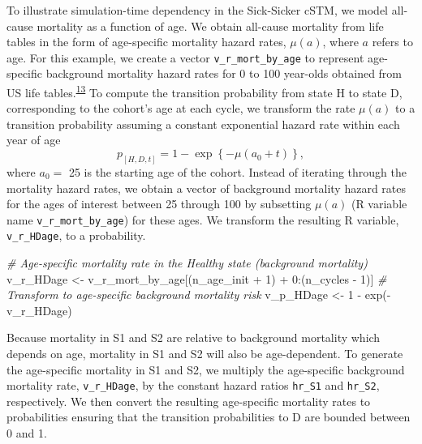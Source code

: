 \documentclass[
]{article}
\newenvironment{Shaded}{\begin{snugshade}}{\end{snugshade}}
\newcommand{\CommentTok}[1]{\textcolor[rgb]{0.56,0.35,0.01}{\textit{#1}}}
\newcommand{\DecValTok}[1]{\textcolor[rgb]{0.00,0.00,0.81}{#1}}
\newcommand{\FunctionTok}[1]{\textcolor[rgb]{0.00,0.00,0.00}{#1}}
\newcommand{\NormalTok}[1]{#1}
\newcommand{\OtherTok}[1]{\textcolor[rgb]{0.56,0.35,0.01}{#1}}
\newcommand{\SpecialCharTok}[1]{\textcolor[rgb]{0.00,0.00,0.00}{#1}}
\begin{document}
To illustrate simulation-time dependency in the Sick-Sicker cSTM, we model all-cause mortality as a function of age. We obtain all-cause mortality from life tables in the form of age-specific mortality hazard rates, \(\mu(a)\), where \(a\) refers to age. For this example, we create a vector \texttt{v\_r\_mort\_by\_age} to represent age-specific background mortality hazard rates for 0 to 100 year-olds obtained from US life tables.\textsuperscript{\protect\hyperlink{ref-Arias2017}{13}} To compute the transition probability from state H to state D, corresponding to the cohort's age at each cycle, we transform the rate \(\mu(a)\) to a transition probability assuming a constant exponential hazard rate within each year of age
\[
  p_{[H,D,t]} = 1-\exp\left\{{-\mu(a_0 + t)}\right\},
\]
where \(a_0 =\) 25 is the starting age of the cohort. Instead of iterating through the mortality hazard rates, we obtain a vector of background mortality hazard rates for the ages of interest between 25 through 100 by subsetting \(\mu(a)\) (R variable name \texttt{v\_r\_mort\_by\_age}) for these ages. We transform the resulting R variable, \texttt{v\_r\_HDage}, to a probability.

\begin{Shaded}
\begin{Highlighting}[]
\CommentTok{\# Age{-}specific mortality rate in the Healthy state (background mortality)}
\NormalTok{v\_r\_HDage }\OtherTok{\textless{}{-}}\NormalTok{ v\_r\_mort\_by\_age[(n\_age\_init }\SpecialCharTok{+} \DecValTok{1}\NormalTok{) }\SpecialCharTok{+} \DecValTok{0}\SpecialCharTok{:}\NormalTok{(n\_cycles }\SpecialCharTok{{-}} \DecValTok{1}\NormalTok{)]}
\CommentTok{\# Transform to age{-}specific background mortality risk}
\NormalTok{v\_p\_HDage  }\OtherTok{\textless{}{-}} \DecValTok{1} \SpecialCharTok{{-}} \FunctionTok{exp}\NormalTok{(}\SpecialCharTok{{-}}\NormalTok{v\_r\_HDage) }
\end{Highlighting}
\end{Shaded}

Because mortality in S1 and S2 are relative to background mortality which depends on age, mortality in S1 and S2 will also be age-dependent. To generate the age-specific mortality in S1 and S2, we multiply the age-specific background mortality rate, \texttt{v\_r\_HDage}, by the constant hazard ratios \texttt{hr\_S1} and \texttt{hr\_S2}, respectively. We then convert the resulting age-specific mortality rates to probabilities ensuring that the transition probabilities to D are bounded between 0 and 1.
\end{document}
